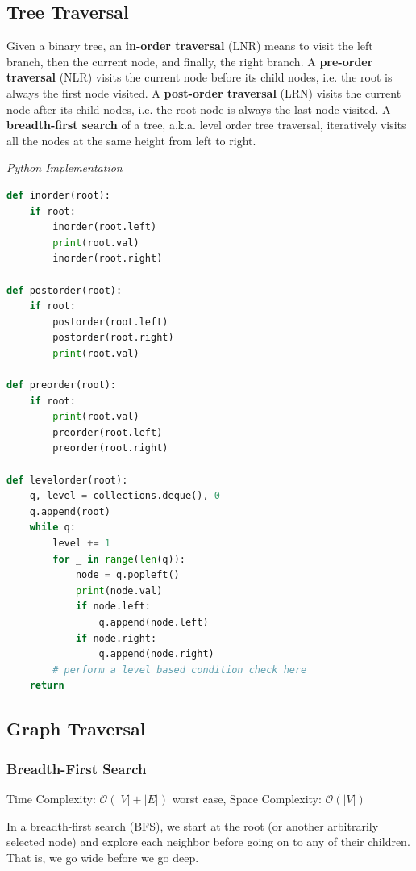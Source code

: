 \documentclass{article}
\newcommand{\bigO}{\mathcal{O}}
\begin{document}
    \subsection{Tree Traversal}
    Given a binary tree, an \textbf{in-order traversal} (LNR) means to visit the left branch, then the current node, and finally, the right branch. A \textbf{pre-order traversal} (NLR) visits the current node before its child nodes, i.e. the root is always the first node visited. A \textbf{post-order traversal} (LRN) visits the current node after its child nodes, i.e. the root node is always the last node visited. A \textbf{breadth-first search} of a tree, a.k.a. level order tree traversal, iteratively visits all the nodes at the same height from left to right.

\vspace{8pt} \emph{Python Implementation}
\begin{lstlisting}[language=Python]  
def inorder(root): 
    if root: 
        inorder(root.left) 
        print(root.val)
        inorder(root.right) 
  
def postorder(root): 
    if root: 
        postorder(root.left) 
        postorder(root.right) 
        print(root.val)
        
def preorder(root): 
    if root: 
        print(root.val)
        preorder(root.left) 
        preorder(root.right)
        
def levelorder(root):
    q, level = collections.deque(), 0
    q.append(root)
    while q:
        level += 1
        for _ in range(len(q)):
            node = q.popleft()
            print(node.val)
            if node.left:
                q.append(node.left)
            if node.right:
                q.append(node.right)
        # perform a level based condition check here
    return
\end{lstlisting}
    \subsection{Graph Traversal}

    \subsubsection{Breadth-First Search}
    Time Complexity: $\bigO(|V| + |E|)$ worst case, Space Complexity: $\bigO(|V|)$
    
    In a breadth-first search (BFS), we start at the root (or another arbitrarily selected node) and explore each neighbor before going on to any of their children. That is, we go wide before we go deep. 
    
\end{document}
